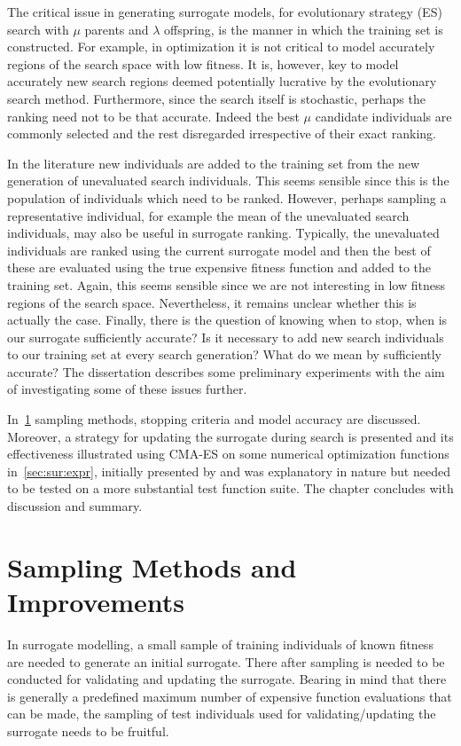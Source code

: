 The critical issue in generating surrogate models, for evolutionary strategy (ES) search \citep[cf.][]{Schwefel95:book} with $\mu$ parents and $\lambda$ offspring, is the manner in which the training set is constructed. For example, in optimization it is not critical to model accurately regions of the search space with low fitness. It is, however, key to model accurately new search regions deemed potentially lucrative by the evolutionary search method. Furthermore, since the search itself is stochastic, perhaps the ranking need not to be that accurate. Indeed the best $\mu$ candidate individuals are commonly selected and the rest disregarded irrespective of their exact ranking. 

In the literature new individuals are added to the training set from the new generation of unevaluated search individuals. This seems sensible since this is the population of individuals which need to be ranked. However, perhaps sampling a representative individual, for example the mean of the unevaluated search individuals, may also be useful in surrogate ranking. Typically, the unevaluated individuals  are ranked using the current surrogate model and then the best of these are evaluated using the true expensive fitness function and added to the training set. Again, this seems sensible since we are not interesting in low fitness regions of the search space. Nevertheless, it remains unclear whether this is actually the case. Finally, there is the question of knowing when to stop, when is our surrogate sufficiently accurate? Is it necessary to add new search individuals  to our training set at every search generation? What do we mean by sufficiently accurate? The dissertation describes some preliminary experiments with the aim of investigating some of these issues further.

In~\cref{sec:samplingstopping} sampling methods, stopping criteria and model accuracy are discussed. Moreover, a strategy for updating the surrogate during search is presented and its effectiveness illustrated using CMA-ES on some numerical optimization functions in~\cref{sec:sur:expr}, initially presented by \cite{InRu11b} and was explanatory in nature but needed to be tested on a more substantial test function suite. The chapter concludes with discussion and summary. %


\section{Sampling Methods and Improvements}\label{sec:samplingstopping}
In surrogate modelling, a small sample of training individuals of known fitness are needed to generate an initial surrogate. There after sampling is needed to be conducted for validating and updating the surrogate. Bearing in mind that there is generally a predefined maximum number of expensive function evaluations that can be made, the sampling of test individuals  used for validating/updating the surrogate needs to be fruitful. 

